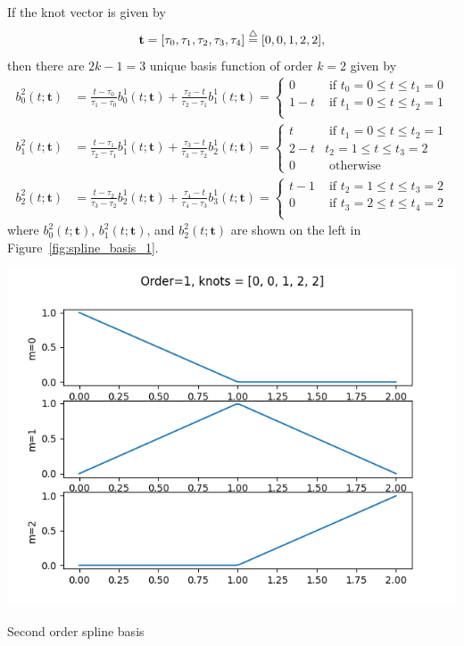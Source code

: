 If the knot vector is given by
\[
\mathbf{t} = [\tau_0, \tau_1, \tau_2, \tau_3, \tau_4] \stackrel{\triangle}{=} [0, 0, 1, 2, 2],
\]
then there are $2k-1=3$ unique basis function of order $k=2$ given by
\begin{align*}
b_0^2(t; \mathbf{t}) &= \frac{t-\tau_0}{\tau_1-\tau_0} b_0^1(t;\mathbf{t}) + \frac{\tau_2-t}{\tau_2-\tau_1}b_1^1(t; \mathbf{t}) 
	= \begin{cases} 0   & \text{~if~} t_0=0 \leq t \leq t_1=0 \\
				    1-t & \text{~if~} t_1=0 \leq t \leq t_2=1 \\ 
 	  \end{cases}
\\ 
b_1^2(t; \mathbf{t}) &= \frac{t-\tau_1}{\tau_2-\tau_1} b_1^1(t;\mathbf{t}) + \frac{\tau_3-t}{\tau_3-\tau_2}b_2^1(t; \mathbf{t})
	= \begin{cases} t & \text{~if~} t_1=0 \leq t \leq t_2=1 \\ 
 									2-t & t_2=1 \leq t \leq t_3=2 \\
 									0 & \text{~otherwise}
 					    \end{cases}
\\ 
b_2^2(t; \mathbf{t}) &= \frac{t-\tau_2}{\tau_3-\tau_2} b_2^1(t;\mathbf{t}) + \frac{\tau_4-t}{\tau_4-\tau_3}b_3^1(t; \mathbf{t})
	= \begin{cases} t-1 & \text{~if~} t_2=1 \leq t \leq t_3=2 \\ 
 					0 & \text{~if~} t_3=2 \leq t \leq t_4=2 \\
 	  \end{cases}
\end{align*}
where $b_0^2(t; \mathbf{t})$, $b_1^2(t; \mathbf{t})$, and $b_2^2(t; \mathbf{t})$ are shown on the left in Figure~\ref{fig:spline_basis_1}.
\begin{marginfigure}[-2in]
  	\includegraphics[width=\linewidth]{./chap5_trajectory_planning/figures/spline_basis_1}
  \caption{Second order spline basis}
  \label{fig:spline_basis_1}  
\end{marginfigure}
